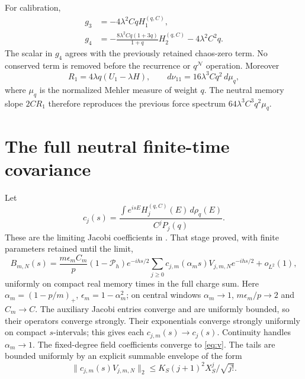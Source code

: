 \documentclass[11pt]{article}
\newcommand{\NN}{\mathcal N}
\newcommand{\HH}{H^{(q,C)}}
\begin{document}
For calibration,
\begin{align}
 g_3&=-4\lambda^2Cq\HH_1,\\
 g_4&=-\frac{8\lambda^2Cq(1+3q)}{1+q}\HH_2
       -4\lambda^2C^2q.
\end{align}
The scalar in $g_4$ agrees with the previously retained chaos-zero
term. No conserved term is removed before the recurrence or
$q^{\NN}$ operation. Moreover
\begin{equation}
 R_1=4\lambda q(U_1-\lambda H),\qquad
 d\nu_{11}=16\lambda^3Cq^2\,d\mu_q,
\end{equation}
where $\mu_q$ is the normalized Mehler measure of weight $q$.
The neutral memory slope $2CR_1$ therefore reproduces the previous
force spectrum $64\lambda^3C^3q^2\mu_q$.

\newpage
\section{The full neutral finite-time covariance}
Let
\begin{equation}
 c_j(s)=\frac{\int e^{isE}\HH_j(E)\,d\rho_q(E)}{C^jP_j(q)}.
\end{equation}
These are the limiting Jacobi coefficients in \cite{Series}.
That stage proved, with finite parameters retained until the limit,
\begin{equation}
 B_{m,N}(s)=\frac{m\epsilon_mC_m}{p}(1-\mathcal P_h)
 e^{-ihs/2}\sum_{j\ge0}c_{j,m}(\alpha_ms)V_{j,m,N}
 e^{-ihs/2}+o_{L^2}(1),
\end{equation}
uniformly on compact real memory times in the full charge sum.
Here $\alpha_m=(1-p/m)_+$, $\epsilon_m=1-\alpha_m^2$;
on central windows $\alpha_m\to1$, $m\epsilon_m/p\to2$ and
$C_m\to C$. The auxiliary Jacobi entries converge and are uniformly
bounded, so their operators converge strongly. Their exponentials
converge strongly uniformly on compact $s$-intervals; this gives
each $c_{j,m}(s)\to c_j(s)$. Continuity handles $\alpha_m\to1$.
The fixed-degree field coefficients converge to \eqref{eq:v}.
The tails are bounded uniformly by
an explicit summable envelope of the form
\begin{equation}
 \|c_{j,m}(s)V_{j,m,N}\|_2
 \le K_S(j+1)^2X_S^j/\sqrt{j!}.
\end{equation}
\end{document}
